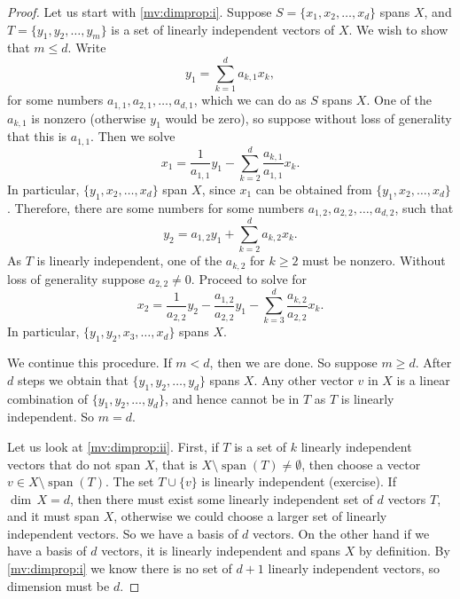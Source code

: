 \documentclass[12pt]{book}
\newcommand{\spn}{\operatorname{span}}
\theoremstyle{plain}
\theoremstyle{remark}
\theoremstyle{definition}
\theoremstyle{exercise}
\theoremstyle{example}
\begin{document}
\begin{proof}
Let us start with \ref{mv:dimprop:i}.
Suppose $S = \{ x_1 , x_2, \ldots, x_d \}$ spans $X$, and
$T = \{ y_1, y_2, \ldots, y_m \}$ is a set of linearly independent
vectors of $X$.  We wish to show that $m \leq d$.
Write
\begin{equation*}
y_1 = \sum_{k=1}^d a_{k,1} x_k ,
\end{equation*}
for some numbers $a_{1,1},a_{2,1},\ldots,a_{d,1}$,
which we can do as $S$ spans $X$.  One of the
$a_{k,1}$ is nonzero (otherwise $y_1$ would be zero),
so suppose without loss of generality that this
is $a_{1,1}$.  Then we solve
\begin{equation*}
x_1 = \frac{1}{a_{1,1}} y_1 - \sum_{k=2}^d \frac{a_{k,1}}{a_{1,1}} x_k .
\end{equation*}
In particular, $\{ y_1 , x_2, \ldots, x_d \}$ span $X$, since $x_1$ can be
obtained from $\{ y_1 , x_2, \ldots, x_d \}$.  Therefore, there are some numbers
for some numbers $a_{1,2},a_{2,2},\ldots,a_{d,2}$, such that
\begin{equation*}
y_2 = a_{1,2} y_1 + \sum_{k=2}^d a_{k,2} x_k .
\end{equation*}
As $T$ is linearly independent, one of the $a_{k,2}$
for $k \geq 2$ must be nonzero.  Without loss of generality suppose 
$a_{2,2} \not= 0$.  Proceed to solve for 
\begin{equation*}
x_2 = \frac{1}{a_{2,2}} y_2 - \frac{a_{1,2}}{a_{2,2}} y_1 - \sum_{k=3}^d
\frac{a_{k,2}}{a_{2,2}} x_k .
\end{equation*}
In particular,
$\{ y_1 , y_2, x_3, \ldots, x_d \}$ spans $X$.

We continue this procedure.  If $m < d$, then we are done.  So suppose
$m \geq d$.
After $d$ steps we obtain that 
$\{ y_1 , y_2, \ldots, y_d \}$ spans $X$.  Any
other vector $v$ in $X$ is a linear combination of
$\{ y_1 , y_2, \ldots, y_d \}$, and hence cannot be in $T$ as $T$ is
linearly independent.  So $m = d$.

Let us look at \ref{mv:dimprop:ii}.
First, if $T$ is a set of $k$ linearly independent vectors
that do not span $X$, that is $X \setminus
\spn (T) \not= \emptyset$, then choose a vector $v \in X \setminus
\spn (T)$.  The set $T \cup \{ v \}$ is linearly independent (exercise).
If $\dim \, X = d$,
then there must exist some linearly independent set of $d$ vectors $T$,
and it must span $X$, otherwise we could choose a larger set of linearly
independent vectors.  So we have a basis of $d$ vectors.
On the other hand if we have a basis of $d$ vectors,
it is linearly independent and spans $X$ by definition.  By \ref{mv:dimprop:i} we know
there is no set of $d+1$ linearly independent vectors, so dimension must be $d$.


\end{proof}
\end{document}
